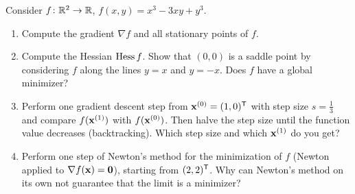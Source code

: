 Consider $f\colon\mathbb{R}^2\to\mathbb{R}$, $f(x,y)=x^3-3xy+y^3$.
\begin{enumerate}
\item Compute the gradient $\nabla f$ and all stationary points of $f$.
\item Compute the Hessian $\operatorname{Hess} f$. Show that $(0,0)$ is a saddle point by considering $f$ along the lines $y=x$ and $y=-x$. Does $f$ have a global minimizer?
\item Perform one gradient descent step from $\mathbf{x}^{(0)}=(1,0)^{\mathsf{T}}$ with step size $s=\frac13$ and compare $f(\mathbf{x}^{(1)})$ with $f(\mathbf{x}^{(0)})$. Then halve the step size until the function value decreases (backtracking). Which step size and which $\mathbf{x}^{(1)}$ do you get?
\item Perform one step of Newton's method for the minimization of $f$ (Newton applied to $\nabla f(\mathbf{x})=\mathbf{0}$), starting from $(2,2)^{\mathsf{T}}$. Why can Newton's method on its own not guarantee that the limit is a minimizer?
\end{enumerate}

